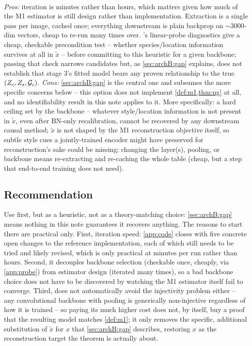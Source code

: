 \paragraph{}
\emph{Pros:} iteration is minutes rather than hours, which matters given how much of the M1 estimator
is still design rather than implementation. Extraction is a single pass per image, cached once;
everything downstream is plain backprop on $\sim\!3000$-dim vectors, cheap to re-run many times over.
's linear-probe diagnostics give a cheap, checkable precondition test -- whether
species/location information survives at all in $\tilde x$ -- before committing to this heuristic for a
given backbone; passing that check narrows candidates but, as \cref{sec:archB:gap} explains, does not
establish that stage 3's fitted model bears any proven relationship to the true $(Z_c,Z_s,\mathcal{G}_c)$.
\emph{Cons:} \cref{sec:archB:gap} is the central one and subsumes the more specific concerns below --
this option does not implement \cref{def:m1,thm:ng} at all, and no identifiability result in this note
applies to it. More specifically: a hard ceiling set by the backbone -- whatever style/location
information is not present in $\tilde x$, even after BN-only recalibration, cannot be recovered by any
downstream causal method; $\tilde x$ is not shaped by the M1 reconstruction objective itself, so subtle
style cues a jointly-trained encoder might have preserved for reconstruction's sake could be missing;
changing the layer(s), pooling, or backbone means re-extracting and re-caching the whole table (cheap,
but a step that end-to-end training does not need).

\subsection{Recommendation}
\label{sec:rec}
Use  first, but as a heuristic, not as a theory-matching choice:
\cref{sec:archB:gap} means nothing in this note guarantees it recovers anything. The reasons to start
there are practical only. First, iteration speed: \cref{app:code} closes with five concrete open
changes to the reference implementation, each of which still needs to be tried and likely revised,
which is only practical at minutes per run rather than hours. Second, it decouples backbone selection
(checkable once, cheaply, via \cref{app:probe}) from estimator design (iterated many times), so a bad
backbone choice does not have to be discovered by watching the M1 estimator itself fail to converge.
Third,  does not automatically avoid the injectivity problem either -- any
convolutional backbone with pooling is generically non-injective regardless of how it is trained -- so
paying its much higher cost does not, by itself, buy a proof that the resulting model matches
\cref{def:m1}; it only removes the specific, additional substitution of $\tilde x$ for $x$ that
\cref{sec:archB:gap} describes, restoring $x$ as the reconstruction target the theorem is actually
about.

